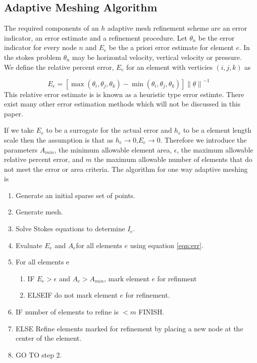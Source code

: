 \documentclass[wrr]{agutex}  %
\begin{document}
\begin{article}
\subsection{Adaptive Meshing Algorithm}
The required components of an $h$ adaptive mesh refinement scheme are an error indicator, an error estimate and a refinement procedure.  Let $\theta_n$ be the error indicator for every node $n$ and $E_e$ be the a priori error estimate for element $e$.  In the stokes problem $\theta_n$ may be horizontal velocity, vertical velocity or pressure.  We define the relative percent error, $E_e$ for an element with verticies $(i,j,k)$ as

\begin{equation}
E_e = {\left[\max\left(\theta_i,\theta_j,\theta_k\right)-\min\left(\theta_i,\theta_j,\theta_k\right)\right] \left\|\underline{\theta}\right\|^{-1}}\label{eqn:err}
\end{equation}
This relative error estimate is is known as a heuristic type error estimte\citep{Bangerth2003}.  There exist many other error estimation methods which will not be discussed in this paper.  

If we take $E_e$ to be a surrogate for the actual error and $h_e$ to be a element length scale then the assumption is that as $h_e\rightarrow 0$,$E_e\rightarrow 0$.  Therefore we introduce the parameters $A_{min}$, the minimum allowable element area, $\epsilon$, the maximum allowable relative percent error, and $m$ the maximum allowable number of elements that do not meet the error or area criteria.  The algorithm for one way adaptive meshing is 

\begin{enumerate}
\item Generate an initial sparse set of points.
\item Generate mesh.
\item Solve Stokes equations to determine $I_e$.
\item Evaluate $E_e$ and $A_e$for all elements $e$ using equation \ref{eqn:err}.
\item For all elements e
	\begin{enumerate}
		\item IF $E_e>\epsilon$ and $A_e>A_{min}$, mark element $e$ for refinment
		\item ELSEIF do not mark element $e$ for refinement.  
	\end{enumerate}
\item IF number of elements to refine is $<m$ FINISH.
\item ELSE Refine elements marked for refinement by placing a new node at the center of the element.
\item GO TO step 2.
\end{enumerate}


\end{article}
\end{document}
